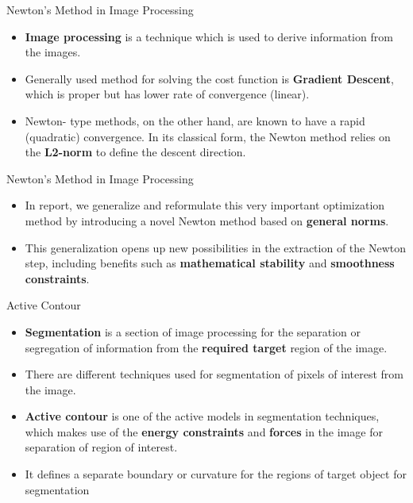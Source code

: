 \documentclass[10pt]{beamer}
\begin{document}
\begin{frame}[fragile]{Newton's Method in Image Processing}
 \begin{itemize}
     \item \textbf{Image processing} is a technique which is used to derive information from the images.
     \item Generally used method for solving the cost function is \textbf{Gradient Descent}, which is proper but has lower rate of convergence (linear).
     \item Newton- type methods, on the other hand, are known to have a rapid (quadratic) convergence. In its classical form, the Newton method relies on the \textbf{L2-norm} to define the descent direction. 
    
   \end{itemize}

\end{frame}

\begin{frame}{Newton's Method in Image Processing}
    \begin{itemize}
        \item In report, we generalize and reformulate this very important optimization method by introducing a novel Newton method based on \textbf{general norms}. 
        \item This generalization opens up new possibilities in the extraction of the Newton step, including benefits such as \textbf{mathematical stability} and \textbf{smoothness constraints}. 
    \end{itemize}
\end{frame}
\begin{frame}{Active Contour}
    \begin{itemize}
        \item  \textbf{Segmentation} is a section of image processing for the separation or segregation of information from the \textbf{required target} region of the image. 
        \item There are different techniques used for segmentation of pixels of interest from the image.
        \item \textbf{Active contour} is one of the active models in segmentation techniques, which makes use of the \textbf{energy constraints} and \textbf{forces} in the image for separation of region of interest. 
        \item It defines a separate boundary or curvature for the regions of target object for segmentation
    \end{itemize}
\end{frame}
\end{document}
